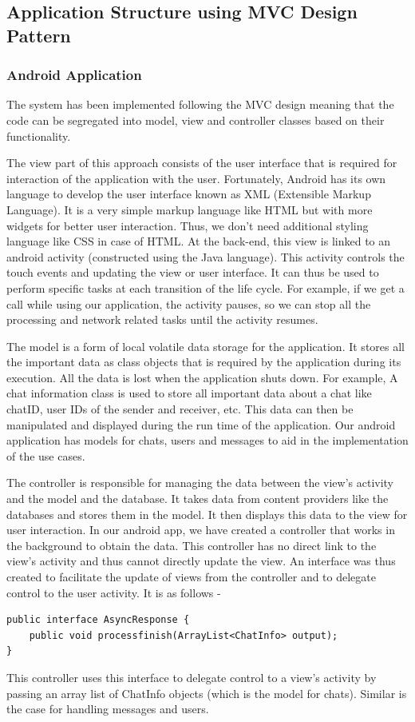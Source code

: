 \documentclass{article}
\begin{document}
\subsection{Application Structure using MVC Design Pattern}
\subsubsection{Android Application}
The system has been implemented following the MVC design meaning that the code can be segregated into model, view and controller classes based on their functionality.\par
The view part of this approach consists of the user interface that is required for interaction of the application with the user. Fortunately, Android has its own language to develop the user interface known as XML (Extensible Markup Language). It is a very simple markup language like HTML but with more widgets for better user interaction. Thus, we don't need additional styling language like CSS in case of HTML. At the back-end, this view is linked to an android activity (constructed using the Java language). This activity controls the touch events and updating the view or user interface. It can thus be used to perform specific tasks at each transition of the life cycle. For example, if we get a call while using our application, the activity pauses, so we can stop all the processing and network related tasks until the activity resumes. \par
The model is a form of local volatile data storage for the application. It stores all the important data as class objects that is required by the application during its execution. All the data is lost when the application shuts down. For example, A chat information class is used to store all important data about a chat like chatID, user IDs of the sender and receiver, etc. This data can then be manipulated and displayed during the run time of the application. Our android application has models for chats, users and messages to aid in the implementation of the use cases. \par
The controller is responsible for managing the data between the view’s activity and the model and the database. It takes data from content providers like the databases and stores them in the model. It then displays this data to the view for user interaction. In our android app, we have created a controller that works in the background to obtain the data. This controller has no direct link to the view’s activity and thus cannot directly update the view. An interface was thus created to facilitate the update of views from the controller and to delegate control to the user activity. It is as follows -
\begin{lstlisting}
public interface AsyncResponse {
    public void processfinish(ArrayList<ChatInfo> output);
}
\end{lstlisting}
This controller uses this interface to delegate control to a view’s activity by passing an array list of ChatInfo objects (which is the model for chats). Similar is the case for handling messages and users.
\end{document}
